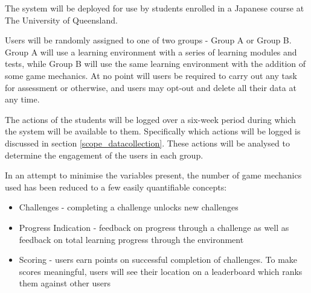 The system will be deployed for use by students enrolled in a Japanese course at
The University of Queensland.

Users will be randomly assigned to one of two groups - Group A or Group B. Group
A will use a learning environment with a series of learning modules and tests,
while Group B will use the same learning environment with the addition of some 
game mechanics. At no point will users be required to carry out any task for
assessment or otherwise, and users may opt-out and delete all their data at
any time.

The actions of the students will be logged over a six-week period during which
the system will be available to them. Specifically which actions will be logged
is discussed in section \ref{scope_datacollection}. These actions will be 
analysed to determine the engagement of the users in each group.

In an attempt to minimise the variables present, the number of game mechanics
used has been reduced to a few easily quantifiable concepts:
\begin{itemize}
	\item Challenges - completing a challenge unlocks new challenges
	\item Progress Indication - feedback on progress through a challenge as well
		as feedback on total learning progress through the environment
	\item Scoring - users earn points on successful completion of challenges. To
		make scores meaningful, users will see their location on a leaderboard
		which ranks them against other users
\end{itemize}
